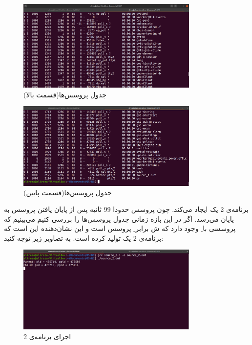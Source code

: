 \documentclass{article}
\begin{document}
\begin{figure}[H]
    \centering
    \includegraphics[width=0.8\textwidth]{figures/6.2.1.3.png}
    \caption{جدول پروسس‌ها(قسمت بالا)}
    \label{fig:fig1}
\end{figure}

\begin{figure}[H]
    \centering
    \includegraphics[width=0.8\textwidth]{figures/6.2.1.2.png}
    \caption{جدول پروسس‌ها(قسمت پایین)}
    \label{fig:fig1}
\end{figure}

برنامه‌ی 2 یک  ایجاد می‌کند. چون پروسس  حدودا 99 ثانیه پس از پایان یافتن پروسس  به پایان می‌رسد. اگر در این بازه زمانی جدول پروسس‌ها را بررسی کنیم می‌بینیم که پروسسی با ِ  وجود دارد که ش برابر ِ پروسس  است و این نشان‌دهنده این است که برنامه‌ی 2 یک  تولید کرده است. به تصاویر زیر توجه کنید:
\begin{figure}[H]
    \centering
    \includegraphics[width=0.8\textwidth]{figures/6.2.2.1.png}
    \caption{اجرای برنامه‌ی 2}
    \label{fig:fig1}
\end{figure}
\end{document}
